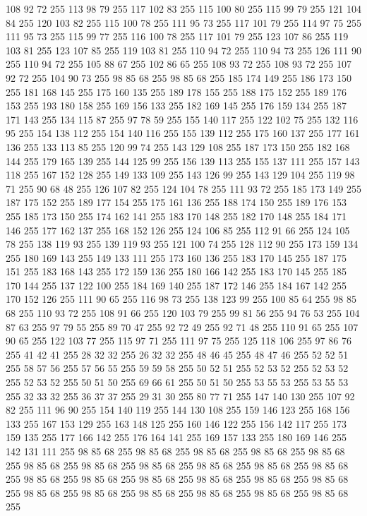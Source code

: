108 92 72 255 113 98 79 255 117 102 83 255 115 100 80 255 115 99 79 255 121 104 84 255 120 103 82 255 115 100 78 255 111 95 73 255 117 101 79 255 114 97 75 255 111 95 73 255 115 99 77 255 116 100 78 255 117 101 79 255 123 107 86 255 119 103 81 255 123 107 85 255 119 103 81 255 110 94 72 255 110 94 73 255 126 111 90 255 110 94 72 255 105 88 67 255 102 86 65 255 108 93 72 255 108 93 72 255 107 92 72 255 104 90 73 255 98 85 68 255 98 85 68 255 185 174 149 255 186 173 150 255 181 168 145 255 175 160 135 255 189 178 155 255 188 175 152 255 189 176 153 255 193 180 158 255 169 156 133 255 182 169 145 255 176 159 134 255 187 171 143 255 134 115 87 255 97 78 59 255 155 140 117 255 122 102 75 255 132 116 95 255 154 138 112 255 154 140 116 255 155 139 112 255 175 160 137 255 177 161 136 255 133 113 85 255 120 99 74 255 143 129 108 255 187 173 150 255 182 168 144 255 179 165 139 255 144 125 99 255 156 139 113 255 155 137 111 255 157 143 118 255 167 152 128 255
149 133 109 255 143 126 99 255 143 129 104 255 119 98 71 255 90 68 48 255 126 107 82 255 124 104 78 255 111 93 72 255 185 173 149 255 187 175 152 255 189 177 154 255 175 161 136 255 188 174 150 255 189 176 153 255 185 173 150 255 174 162 141 255 183 170 148 255 182 170 148 255 184 171 146 255 177 162 137 255 168 152 126 255 124 106 85 255 112 91 66 255 124 105 78 255 138 119 93 255 139 119 93 255 121 100 74 255 128 112 90 255 173 159 134 255 180 169 143 255 149 133 111 255 173 160 136 255 183 170 145 255 187 175 151 255 183 168 143 255 172 159 136 255 180 166 142 255 183 170 145 255 185 170 144 255 137 122 100 255 184 169 140 255 187 172 146 255 184 167 142 255 170 152 126 255 111 90 65 255 116 98 73 255 138 123 99 255 100 85 64 255 98 85 68 255 110 93 72 255 108 91 66 255 120 103 79 255 99 81 56 255 94 76 53 255 104 87 63 255 97 79 55 255 89 70 47 255 92 72 49 255 92 71 48 255 110 91 65 255 107 90 65 255 122 103 77 255 115 97 71 255 111 97 75 255
125 118 106 255 97 86 76 255 41 42 41 255 28 32 32 255 26 32 32 255 48 46 45 255 48 47 46 255 52 52 51 255 58 57 56 255 57 56 55 255 59 59 58 255 50 52 51 255 52 53 52 255 52 53 52 255 52 53 52 255 50 51 50 255 69 66 61 255 50 51 50 255 53 55 53 255 53 55 53 255 32 33 32 255 36 37 37 255 29 31 30 255 80 77 71 255 147 140 130 255 107 92 82 255 111 96 90 255 154 140 119 255 144 130 108 255 159 146 123 255 168 156 133 255 167 153 129 255 163 148 125 255 160 146 122 255 156 142 117 255 173 159 135 255 177 166 142 255 176 164 141 255 169 157 133 255 180 169 146 255 142 131 111 255 98 85 68 255 98 85 68 255 98 85 68 255 98 85 68 255 98 85 68 255 98 85 68 255 98 85 68 255 98 85 68 255 98 85 68 255 98 85 68 255 98 85 68 255 98 85 68 255 98 85 68 255 98 85 68 255 98 85 68 255 98 85 68 255 98 85 68 255 98 85 68 255 98 85 68 255 98 85 68 255 98 85 68 255 98 85 68 255 98 85 68 255
